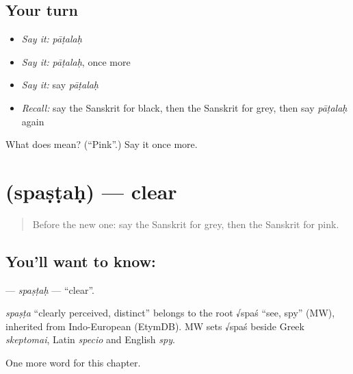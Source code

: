 \subsection*{Your turn}
\begin{itemize}
\raggedright
  \item \emph{Say it:} \emph{pāṭalaḥ}
  \item \emph{Say it:} \emph{pāṭalaḥ}, once more
  \item \emph{Say it:} say \emph{pāṭalaḥ}
  \item \emph{Recall:} say the Sanskrit for black, then the Sanskrit for grey, then say \emph{pāṭalaḥ} again
\end{itemize}

\begin{tcolorbox}[breakable,colback=teal!4,colframe=teal!35!black,title={Before you move on}]
What does  mean? (\textquotedblleft{}Pink\textquotedblright{}.) Say it once more.
\end{tcolorbox}
\section[\texorpdfstring{\sk{स्पष्टः} (spaṣṭaḥ)}{स्पष्टः (spaṣṭaḥ)}]{ (spaṣṭaḥ) — clear}

\label{lesson:SA-C131-spastah}



\begin{quote}
Before the new one: say the Sanskrit for grey, then the Sanskrit for pink.
\end{quote}

\subsection*{You'll want to know: }
\textbf{} — \emph{spaṣṭaḥ} — \textquotedblleft{}clear\textquotedblright{}.

\begin{cousinweb}
\emph{spaṣṭa} \textquotedblleft{}clearly perceived, distinct\textquotedblright{} belongs to the root √spaś \textquotedblleft{}see, spy\textquotedblright{} (MW), inherited from Indo-European (EtymDB). MW sets √spaś beside Greek \emph{skeptomai}, Latin \emph{specio} and English \emph{spy}.
\end{cousinweb}

\begin{grammarlens}[title={What you've built}]
One more word for this chapter.
\end{grammarlens}

